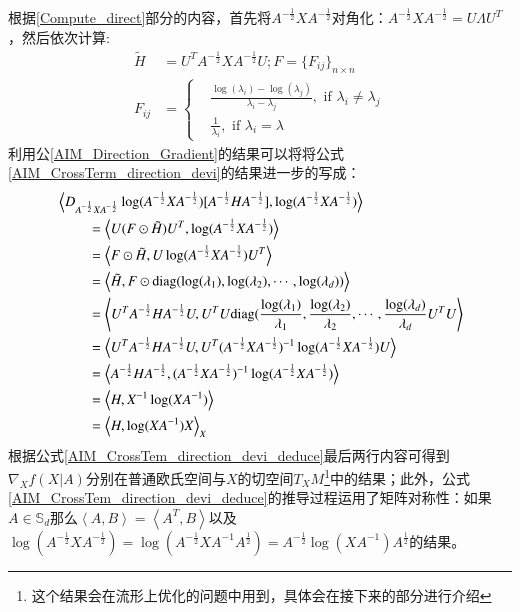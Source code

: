 根据\ref{Compute_direct}部分的内容，首先将$A^{-\frac{1}{2}}XA^{-\frac{1}{2}}$对角化：$A^{-\frac{1}{2}}XA^{-\frac{1}{2}}=U\Lambda U^{T}$，然后依次计算:
\begin{equation}
\label{AIM_Direction_Gradient}
\begin{split}
\tilde{H}&=U^{T}A^{-\frac{1}{2}}XA^{-\frac{1}{2}}U;F=\{F_{ij}\}_{n \times n}\\
F_{ij}&=\left\{
\begin{split}
&\frac{\log(\lambda_{i})-\log(\lambda_{j})}{\lambda_{i}-\lambda_{j}},\text{ if $\lambda_i \neq \lambda_j$}\\
&\frac{1}{\lambda_i},\text{ if $\lambda_i=\lambda$}
\end{split}
\right.
\end{split}
\end{equation}
利用公\ref{AIM_Direction_Gradient}的结果可以将将公式\ref{AIM_CrossTerm_direction_devi}的结果进一步的写成：
\begin{equation}
\label{AIM_CrossTem_direction_devi_deduce}
\begin{split}
&\left<D_{A^{-\frac{1}{2}}XA^{-\frac{1}{2}}}\log(A^{-\frac{1}{2}}XA^{-\frac{1}{2}})[A^{-\frac{1}{2}}HA^{-\frac{1}{2}}],\log(A^{-\frac{1}{2}}XA^{-\frac{1}{2}})\right>\\
&~~~~~~~~~=\left<U(F\odot\tilde{H})U^{T},\log(A^{-\frac{1}{2}}XA^{-\frac{1}{2}})\right>\\
&~~~~~~~~~=\left<F\odot\tilde{H},U\log(A^{-\frac{1}{2}}XA^{-\frac{1}{2}})U^{T}\right>\\
&~~~~~~~~~=\left<\tilde{H},F\odot{\rm diag}(\log(\lambda_1),\log(\lambda_2),\cdots,\log(\lambda_d))\right>\\
&~~~~~~~~~=\left<U^{T}A^{-\frac{1}{2}}HA^{-\frac{1}{2}}U,U^{T}U{\rm diag}(\frac{\log(\lambda_1)}{\lambda_1},\frac{\log(\lambda_2)}{\lambda_2},\cdots,\frac{\log(\lambda_d)}{\lambda_d}U^{T}U\right>\\
&~~~~~~~~~=\left<U^{T}A^{-\frac{1}{2}}HA^{-\frac{1}{2}}U,U^{T}(A^{-\frac{1}{2}}XA^{-\frac{1}{2}})^{-1}\log(A^{-\frac{1}{2}}XA^{-\frac{1}{2}})U\right>\\
&~~~~~~~~~=\left<A^{-\frac{1}{2}}HA^{-\frac{1}{2}},(A^{-\frac{1}{2}}XA^{-\frac{1}{2}})^{-1}\log(A^{-\frac{1}{2}}XA^{-\frac{1}{2}})\right>\\
&~~~~~~~~~=\left<H,X^{-1}\log(XA^{-1})\right>\\
&~~~~~~~~~=\left<H,\log(XA^{-1})X\right>_X\\
\end{split}
\end{equation}
根据公式\ref{AIM_CrossTem_direction_devi_deduce}最后两行内容可得到$\nabla_X f(X|A)$分别在普通欧氏空间与$X$的切空间$T_XM$\footnote{这个结果会在流形上优化的问题中用到，具体会在接下来的部分进行介绍}中的结果；此外，公式\ref{AIM_CrossTem_direction_devi_deduce}的推导过程运用了矩阵对称性：如果$A \in \mathbb{S}_{d}$那么$\left<A,B\right>=\left<A^{T},B\right>$以及$\log(A^{-\frac{1}{2}}XA^{-\frac{1}{2}})=\log(A^{-\frac{1}{2}}XA^{-1}A^{\frac{1}{2}})=A^{-\frac{1}{2}}\log(XA^{-1})A^{\frac{1}{2}}$的结果。
